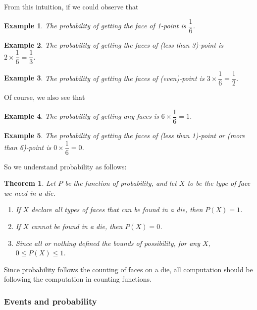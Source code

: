 \documentclass[12pt]{article}
\newtheorem*{theorem}{Theorem}
\newtheorem*{example}{Example}
\begin{document}
    From this intuition, if we could observe that 
    
    \begin{example}
        The probability of getting the face of 1-point is $\dfrac{1}{6}$.
    \end{example}

    \begin{example}
        The probability of getting the faces of (less than 3)-point is $2\times \dfrac{1}{6}=\dfrac{1}{3}$.
    \end{example}

    \begin{example}
        The probability of getting the faces of (even)-point is $3\times \dfrac{1}{6}=\dfrac{1}{2}$.
    \end{example}

    Of course, we also see that 

    \begin{example}
        The probability of getting any faces is $6\times \dfrac{1}{6}=1$.
    \end{example}

    \begin{example}
        The probability of getting the faces of (less than 1)-point or (more than 6)-point is $0\times \dfrac{1}{6}=0$.
    \end{example}

    So we understand probability as follows:

    \begin{theorem}
        Let $P$ be the function of probability, and let $X$ to be the type of face we need in a die. \begin{enumerate}
            \item If $X$ declare all types of faces that can be found in a die, then $P(X)=1$.
            \item If $X$ cannot be found in a die, then $P(X)=0$.
            \item Since all or nothing defined the bounds of possibility, for any $X$, $0\leq P(X)\leq 1$.
        \end{enumerate}
    \end{theorem}

    Since probability follows the counting of faces on a die, all computation should be following the computation in counting functions.

    \subsubsection*{Events and probability}
\end{document}
